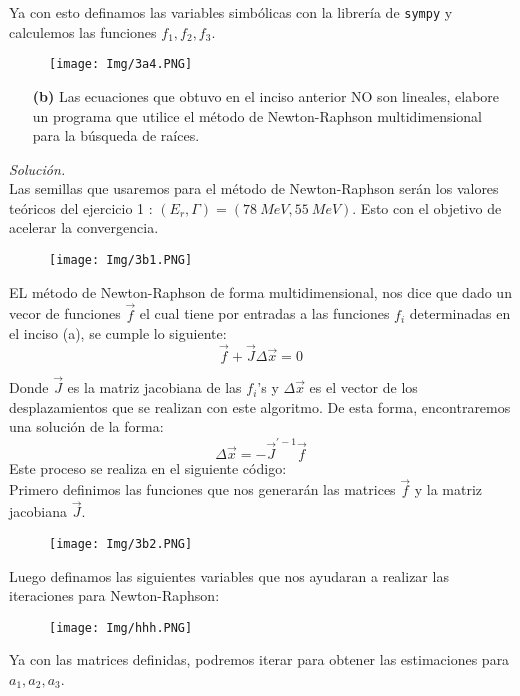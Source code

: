 \documentclass[11pt]{article}
\begin{document}
	Ya con esto definamos las variables simbólicas con la librería de \texttt{sympy} y calculemos las funciones $f_1, f_2, f_3$.
	
	\begin{figure}[h!]
		\centering
		\texttt{[image: Img/3a4.PNG]}
	\end{figure}



\begin{enumerate}
	\item [\textbf{(b)}] Las ecuaciones que obtuvo en el inciso anterior NO son lineales, elabore un programa que utilice el método de Newton-Raphson
	multidimensional para la búsqueda de raíces.
\end{enumerate}
\textit{Solución.}\\
	Las semillas que usaremos para el método de Newton-Raphson serán los valores teóricos del ejercicio 1 : $(E_r,\Gamma) = (\SI{78}{MeV}, \SI{55}{MeV})$. Esto con el objetivo de acelerar la convergencia.
	
	\begin{figure}[h]
		\centering
		\texttt{[image: Img/3b1.PNG]}
	\end{figure}
	
	EL método de Newton-Raphson de forma multidimensional, nos dice que dado un vecor de funciones $\vec{f}$ el cual tiene por entradas a las funciones $f_i$ determinadas en el inciso (a), se cumple lo siguiente:
	$$\vec{f}  + \vec{J} \Delta \vec{x} = 0$$
	
	Donde $\vec{J}$ es la matriz jacobiana de las $f_i$'s y $\Delta \vec{x}$  es el vector de los desplazamientos que se realizan con este algoritmo. De esta forma, encontraremos una solución de la forma:
		$$ \Delta \vec{x} =  - \vec{J}^{\prime - 1} \vec{f}$$
	Este proceso se realiza en el siguiente código:\\
	Primero definimos las funciones que nos generarán las matrices $\vec{f}$ y la matriz jacobiana $\vec{J}$.
	\begin{figure}[h]
		\centering
		\texttt{[image: Img/3b2.PNG]}
	\end{figure}
	
	Luego definamos las siguientes variables que nos ayudaran a realizar las iteraciones para Newton-Raphson:
	\begin{figure}[h]
		\centering
		\texttt{[image: Img/hhh.PNG]}
	\end{figure}
\newpage
Ya con las matrices definidas, podremos iterar para obtener las estimaciones para $a_1,a_2,a_3$. 
\end{document}
